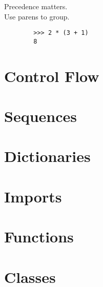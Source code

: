 \documentclass[a4paper]{tufte-handout}
\newenvironment{abjadbookoutput}{}{}
\begin{document}
    \begin{multicols}{2}

        Precedence matters. \\
        Use parens to group.

        \begin{comment}
        <abjad>
        2 * (3 + 1)
        </abjad>
        \end{comment}

        \begin{abjadbookoutput}
        \hfill
        \begin{verbatim}
        >>> 2 * (3 + 1)
        8
        \end{verbatim}
        \end{abjadbookoutput}

    \end{multicols}

\section{Control Flow}

\section{Sequences}

\section{Dictionaries}

\section{Imports}

\section{Functions}

\section{Classes}
\end{document}
